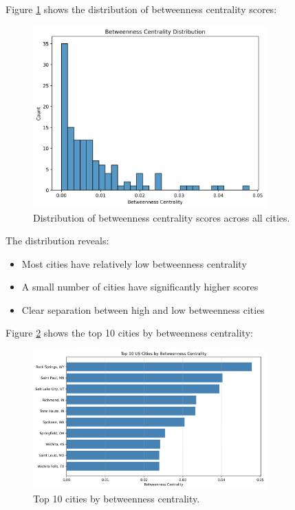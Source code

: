 Figure \ref{fig:betweenness_dist} shows the distribution of betweenness centrality scores:

\begin{figure}[H]
    \centering
    \includegraphics[width=0.8\textwidth]{figures/betweenness_distribution.png}
    \caption{Distribution of betweenness centrality scores across all cities.}
    \label{fig:betweenness_dist}
\end{figure}

The distribution reveals:
\begin{itemize}
    \item Most cities have relatively low betweenness centrality
    \item A small number of cities have significantly higher scores
    \item Clear separation between high and low betweenness cities
\end{itemize}

Figure \ref{fig:top_betweenness} shows the top 10 cities by betweenness centrality:

\begin{figure}[H]
    \centering
    \includegraphics[width=0.8\textwidth]{figures/top_betweenness.png}
    \caption{Top 10 cities by betweenness centrality.}
    \label{fig:top_betweenness}
\end{figure}

